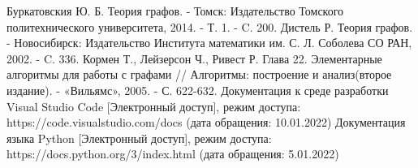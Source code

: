 \begin{thebibliography}{3}
Буркатовския Ю. Б. Теория графов. - Томск: Издательство Томского политехнического университета, 2014. - Т. 1. - C. 200.
Дистель Р. Теория графов. - Новосибирск: Издательство Института математики им. С. Л. Соболева СО РАН, 2002. - C. 336.
Кормен Т., Лейзерсон Ч., Ривест Р. Глава 22. Элементарные алгоритмы для работы с графами // Алгоритмы: построение и анализ(второе издание). - «Вильямс», 2005. - С. 622-632.
Документация к среде разработки Visual Studio Code [Электронный доступ], режим доступа: https://code.visualstudio.com/docs (дата обращения: 10.01.2022)
Документация языка Python [Электронный доступ], режим доступа: https://docs.python.org/3/index.html (дата обращения: 5.01.2022)\\
\end{thebibliography}